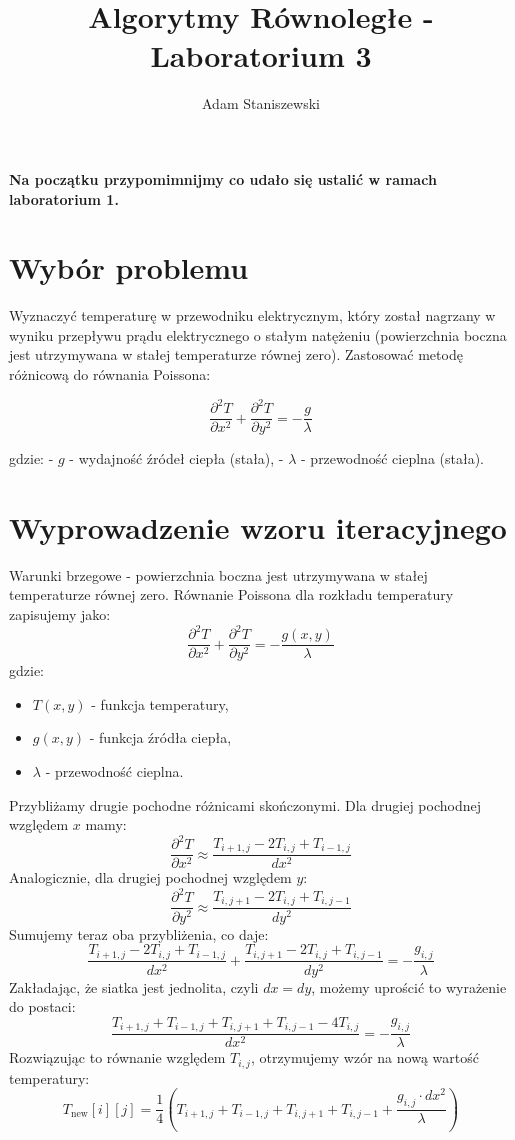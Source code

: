 \documentclass{article}
\title{Algorytmy Równoległe - Laboratorium 3}
\author{Adam Staniszewski}
\begin{document}
\maketitle
\textbf{Na początku przypomimnijmy co udało się ustalić w ramach laboratorium 1.}

\section*{Wybór problemu}

Wyznaczyć temperaturę w przewodniku elektrycznym, który został nagrzany w wyniku przepływu prądu elektrycznego o stałym natężeniu (powierzchnia boczna jest utrzymywana w stałej temperaturze równej zero).
Zastosować metodę różnicową do równania Poissona:

\[
\frac{\partial^2 T}{\partial x^2} + \frac{\partial^2 T}{\partial y^2} = -\frac{g}{\lambda}
\]

gdzie:
- \( g \) - wydajność źródeł ciepła (stała),
- \( \lambda \) - przewodność cieplna (stała).


\section*{Wyprowadzenie wzoru iteracyjnego}
Warunki brzegowe - powierzchnia boczna jest utrzymywana w stałej temperaturze równej zero.
Równanie Poissona dla rozkładu temperatury zapisujemy jako:
\[
\frac{\partial^2 T}{\partial x^2} + \frac{\partial^2 T}{\partial y^2} = -\frac{g(x, y)}{\lambda}
\]
gdzie:
\begin{itemize}
    \item \( T(x, y) \) - funkcja temperatury,
    \item \( g(x, y) \) - funkcja źródła ciepła,
    \item \( \lambda \) - przewodność cieplna.
\end{itemize}
Przybliżamy drugie pochodne różnicami skończonymi. Dla drugiej pochodnej względem \( x \) mamy:
\[
\frac{\partial^2 T}{\partial x^2} \approx \frac{T_{i+1, j} - 2T_{i, j} + T_{i-1, j}}{dx^2}
\]
Analogicznie, dla drugiej pochodnej względem \( y \):
\[
\frac{\partial^2 T}{\partial y^2} \approx \frac{T_{i, j+1} - 2T_{i, j} + T_{i, j-1}}{dy^2}
\]
Sumujemy teraz oba przybliżenia, co daje:
\[
\frac{T_{i+1, j} - 2T_{i, j} + T_{i-1, j}}{dx^2} + \frac{T_{i, j+1} - 2T_{i, j} + T_{i, j-1}}{dy^2} = -\frac{g_{i, j}}{\lambda}
\]
Zakładając, że siatka jest jednolita, czyli \( dx = dy \), możemy uprościć to wyrażenie do postaci:
\[
\frac{T_{i+1, j} + T_{i-1, j} + T_{i, j+1} + T_{i, j-1} - 4T_{i, j}}{dx^2} = -\frac{g_{i, j}}{\lambda}
\]
Rozwiązując to równanie względem \( T_{i, j} \), otrzymujemy wzór na nową wartość temperatury:
\[
T_{\text{new}}[i][j] = \frac{1}{4} \left( T_{i+1, j} + T_{i-1, j} + T_{i, j+1} + T_{i, j-1} + \frac{g_{i, j} \cdot dx^2}{\lambda} \right)
\]
\end{document}
